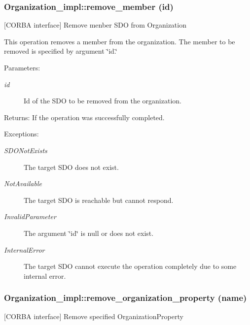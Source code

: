 \subsubsection{\setlength{\rightskip}{0pt plus 5cm}Organization\_\-impl::remove\_\-member (id)}\label{classOrganization__impl_Organization__impla11}


[CORBA interface] Remove menber SDO from Organization 

This operation removes a member from the organization. The member to be removed is specified by argument \char`\"{}id.\char`\"{}

\begin{Desc}
\item[Parameters:]
\begin{description}
\item[{\em id}]Id of the SDO to be removed from the organization. \end{description}
\end{Desc}
\begin{Desc}
\item[Returns:]If the operation was successfully completed. \end{Desc}
\begin{Desc}
\item[Exceptions:]
\begin{description}
\item[{\em SDONot\-Exists}]The target SDO does not exist. \item[{\em Not\-Available}]The target SDO is reachable but cannot respond. \item[{\em Invalid\-Parameter}]The argument \char`\"{}id\char`\"{} is null or does not exist. \item[{\em Internal\-Error}]The target SDO cannot execute the operation completely due to some internal error.\end{description}
\end{Desc}
\subsubsection{\setlength{\rightskip}{0pt plus 5cm}Organization\_\-impl::remove\_\-organization\_\-property (name)}\label{classOrganization__impl_Organization__impla5}


[CORBA interface] Remove specified Organization\-Property 


